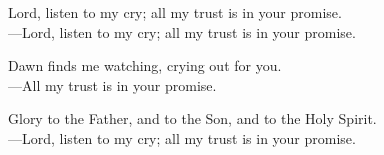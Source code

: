\responsory

\noindent Lord, listen to my cry; all my trust is in your promise.\\
{\color{red}---\thinspace}Lord, listen to my cry; all my trust is in your promise.

\medskip\noindent Dawn finds me watching, crying out for you.\\
{\color{red}---\thinspace}All my trust is in your promise.

\medskip\noindent Glory to the Father, and to the Son, and to the Holy Spirit.\\
{\color{red}---\thinspace}Lord, listen to my cry; all my trust is in your promise.